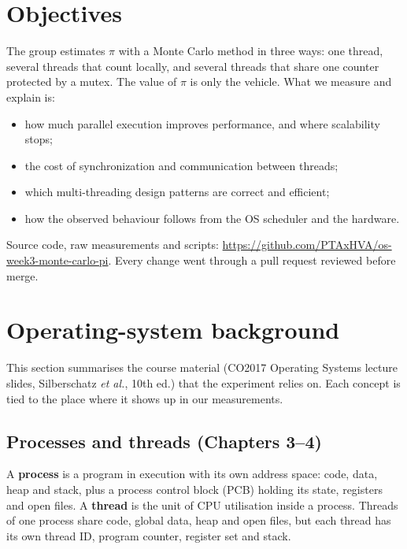 \documentclass[11pt,a4paper]{article}
\begin{document}
\sloppy

\newpage

\section{Objectives}
The group estimates $\pi$ with a Monte Carlo method in three ways: one thread, several threads that count locally, and several threads that share one counter protected by a mutex. The value of $\pi$ is only the vehicle. What we measure and explain is:
\begin{itemize}[nosep]
  \item how much parallel execution improves performance, and where scalability stops;
  \item the cost of synchronization and communication between threads;
  \item which multi-threading design patterns are correct and efficient;
  \item how the observed behaviour follows from the OS scheduler and the hardware.
\end{itemize}

Source code, raw measurements and scripts: \url{https://github.com/PTAxHVA/os-week3-monte-carlo-pi}. Every change went through a pull request reviewed before merge.

\section{Operating-system background}
\label{sec:background}
This section summarises the course material (CO2017 Operating Systems lecture slides, Silberschatz \emph{et al.}, 10th ed.) that the experiment relies on. Each concept is tied to the place where it shows up in our measurements.

\subsection{Processes and threads (Chapters 3--4)}
A \textbf{process} is a program in execution with its own address space: code, data, heap and stack, plus a process control block (PCB) holding its state, registers and open files. A \textbf{thread} is the unit of CPU utilisation inside a process. Threads of one process share code, global data, heap and open files, but each thread has its own thread ID, program counter, register set and stack.
\end{document}

